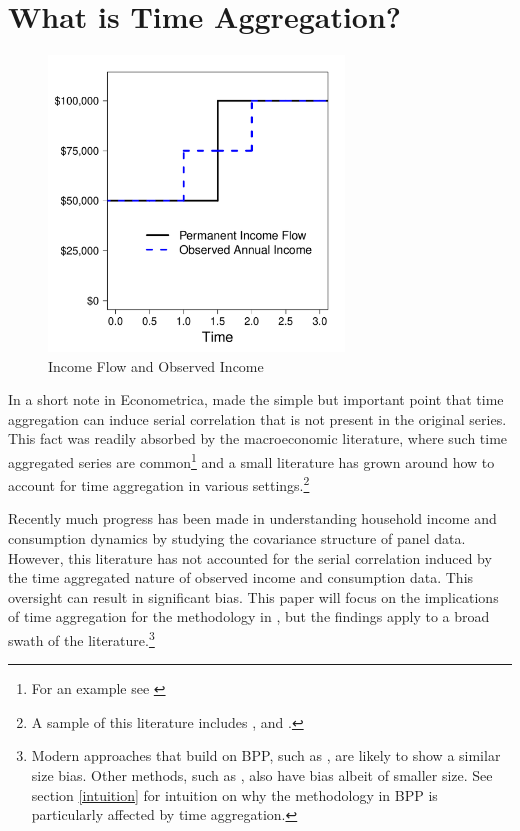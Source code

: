 \documentclass[AER]{AEA}
\begin{document}
\section{What is Time Aggregation?}
\begin{figure}
	\includegraphics[width=0.7\textwidth]{../Code/Figures/TimeAggAER_simple.pdf}
	\caption{Income Flow and Observed Income}
	\label{fig:TimeAggExample}
\end{figure}
In a short note in Econometrica, \cite{working_note_1960} made the simple but important point that time aggregation can induce serial correlation that is not present in the original series. This fact was readily absorbed by the macroeconomic literature, where such time aggregated series are common\footnote{For an example see \cite{campbell_consumption_1989}} and a small literature has grown around how to account for time aggregation in various settings.\footnote{A sample of this literature includes \cite{amemiya_effect_1972}, \cite{weiss_systematic_1984} and \cite{drost_temporal_1993}.}

Recently much progress has been made in understanding household income and consumption dynamics by studying the covariance structure of panel data. However, this literature has not accounted for the serial correlation induced by the time aggregated nature of observed income and consumption data. This oversight can result in significant bias. This paper will focus on the implications of time aggregation for the methodology in \cite{blundell_consumption_2008}, but the findings apply to a broad swath of the literature.\footnote{Modern approaches that build on BPP, such as \cite{arellano_earnings_2017}, are likely to show a similar size bias. Other methods, such as \cite{carroll_nature_1997}, also have bias albeit of smaller size. See section \ref{intuition} for intuition on why the methodology in BPP is particularly affected by time aggregation.}
\end{document}
